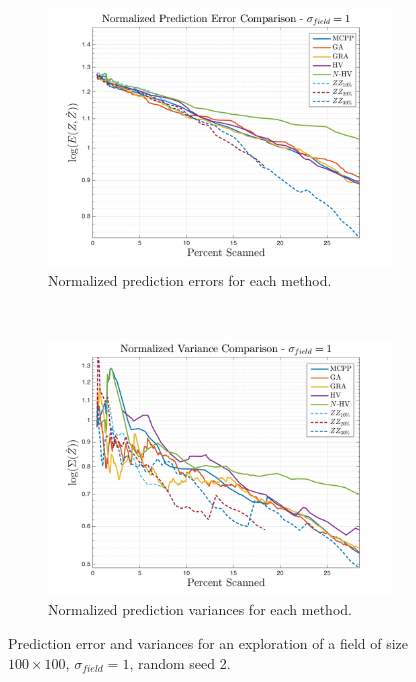 \begin{figure}[htb!]
    \centering
    \begin{subfigure}[t]{0.75\textwidth}
        \centering
        \includegraphics[width=\linewidth]{figures/results/normalized_errors_30p_100x100_sf_1_seed_2_app_50.png}
        \captionsetup{skip=0.20\baselineskip,size=footnotesize}
        \caption{Normalized prediction errors for each method.}
    \end{subfigure}%
    \\
    \begin{subfigure}[t]{0.75\textwidth}
        \centering
        \includegraphics[width=\linewidth]{figures/results/normalized_variances_30p_100x100_sf_1_seed_2_app_50.png}
        \captionsetup{skip=0.20\baselineskip,size=footnotesize}
        \caption{Normalized prediction variances for each method.}
    \end{subfigure}%
    \captionsetup{skip=0.20\baselineskip}
    \caption{Prediction error and variances for an exploration of a field of size $100 \times 100$, $\sigma_{field} = 1$, random seed 2.}
    \label{fig:errvar1}
\end{figure}

\FloatBarrier
\clearpage